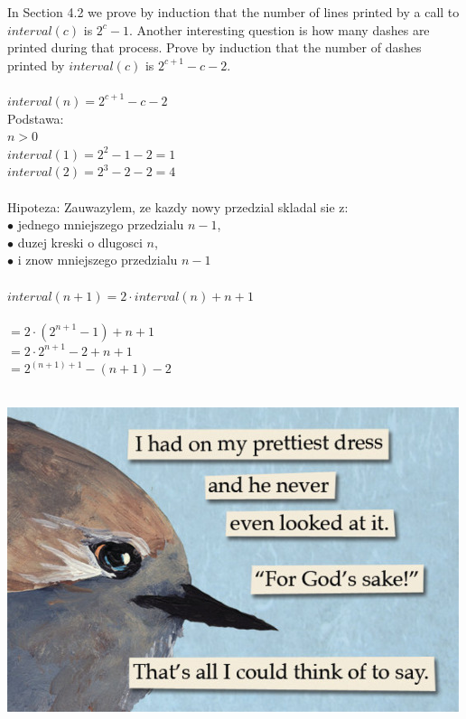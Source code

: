 \documentclass{article}
\begin{document}
In Section 4.2 we prove by induction that the number of lines printed by a call to $interval(c)$ is $2^{c} - 1$. Another interesting question is how many dashes are printed during that process. Prove by induction that the number of dashes printed by $interval(c)$ is $2^{c+1} -c-2$.\\\\

$interval(n) = 2^{c+1}-c-2 $\\
Podstawa:\\
$n > 0$\\
$interval(1) = 2^{2}-1-2 = 1$\\
$interval(2) = 2^{3}-2-2 = 4$\\\\

Hipoteza:
 Zauwazylem, ze kazdy nowy przedzial skladal sie z: \\
$\bullet $ jednego mniejszego przedzialu $n-1$, \\
$\bullet $ duzej kreski o dlugosci $n$, \\
$\bullet $ i znow mniejszego przedzialu $n-1$\\\\
$interval(n+1) = 2\cdot interval(n)+n+1$\\\\
$= 2\cdot(2^{n+1}-1) + n + 1$\\
$= 2\cdot 2^{n+1}- 2 +n+1$\\
$= 2^{(n+1)+1}-(n+1)-2 $\\\\


\begin{center}
	\includegraphics[scale=0.5]{birb}
\end{center}
\end{document}

